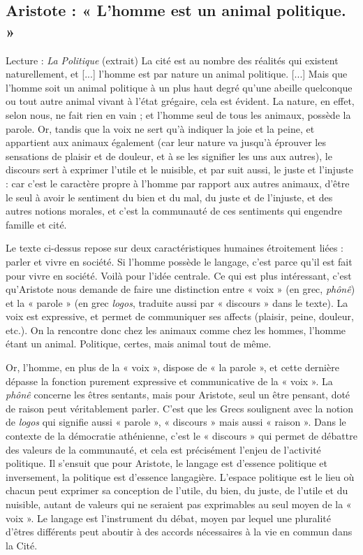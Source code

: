 \subsection{Aristote : « L’homme est un animal politique. »}
\begin{lecture}{Lecture : \textit{La Politique} (extrait)}
La cité est au nombre des réalités qui existent naturellement, et [...] l’homme est par nature un animal politique. [...] Mais que l’homme soit un animal politique à un plus haut degré qu’une abeille quelconque ou tout autre animal vivant à l’état grégaire, cela est évident. La nature, en effet, selon nous, ne fait rien en vain ; et l’homme seul de tous les animaux, possède la parole. Or, tandis que la voix ne sert qu’à indiquer la joie et la peine, et appartient aux animaux également (car leur nature va jusqu’à éprouver les sensations de plaisir et de douleur, et à se les signifier les uns aux autres), le discours sert à exprimer l’utile et le nuisible, et par suit aussi, le juste et l’injuste : car c’est le caractère propre à l’homme par rapport aux autres animaux, d’être le seul à avoir le sentiment du bien et du mal, du juste et de l’injuste, et des autres notions morales, et c’est la communauté de ces sentiments qui engendre famille et cité.
\end{lecture}
Le texte ci-dessus repose sur deux caractéristiques humaines étroitement liées : parler et vivre en société. Si l’homme possède le langage, c’est parce qu’il est fait pour vivre en société. Voilà pour l’idée centrale. Ce qui est plus intéressant, c’est qu’Aristote nous demande de faire une distinction entre « voix » (en grec, \textit{phônê}) et la « parole » (en grec \textit{logos}, traduite aussi par « discours » dans le texte). La voix est expressive, et permet de communiquer ses affects (plaisir, peine, douleur, etc.). On la rencontre donc chez les animaux comme chez les hommes, l’homme étant un animal. Politique, certes, mais animal tout de même.

Or, l’homme, en plus de la « voix », dispose de « la parole », et cette dernière dépasse la fonction purement expressive et communicative de la « voix ». La \textit{phônê} concerne les êtres sentants, mais pour Aristote, seul un être pensant, doté de raison peut véritablement parler. C’est que les Grecs soulignent avec la notion de \textit{logos} qui signifie aussi « parole », « discours » mais aussi « raison ». Dans le contexte de la démocratie athénienne, c’est le « discours » qui permet de débattre des valeurs de la communauté, et cela est précisément l’enjeu de l’activité politique. Il s’ensuit que pour Aristote, le langage est d’essence politique et inversement, la politique est d’essence langagière. L’espace politique est le lieu où chacun peut exprimer sa conception de l’utile, du bien, du juste, de l’utile et du nuisible, autant de valeurs qui ne seraient pas exprimables au seul moyen de la « voix ». Le langage est l’instrument du débat, moyen par lequel une pluralité d’êtres différents peut aboutir à des accords nécessaires à la vie en commun dans la Cité.
